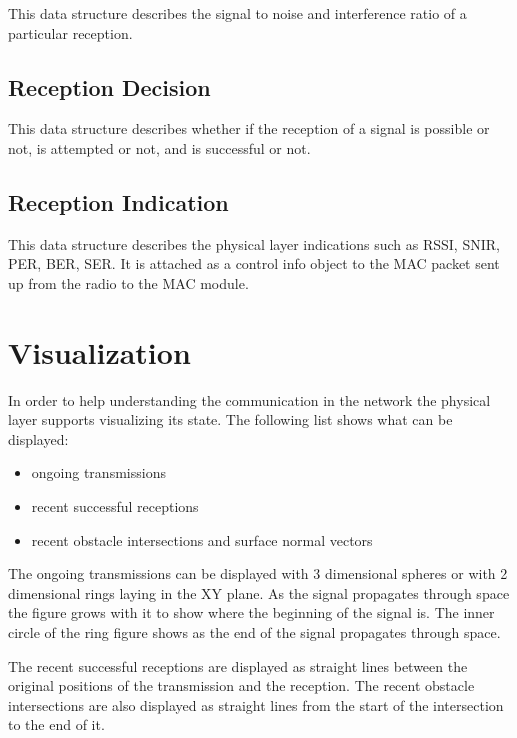 This data structure describes the signal to noise and interference ratio of a
particular reception.

\subsection{Reception Decision}

This data structure describes whether if the reception of a signal is possible
or not, is attempted or not, and is successful or not.

\subsection{Reception Indication}

This data structure describes the physical layer indications such as RSSI, SNIR,
PER, BER, SER. It is attached as a control info object to the MAC packet sent up
from the radio to the MAC module.

\section{Visualization}

In order to help understanding the communication in the network the physical
layer supports visualizing its state. The following list shows what can be
displayed:

\begin{itemize}
  \item ongoing transmissions
  \item recent successful receptions
  \item recent obstacle intersections and surface normal vectors
\end{itemize}

The ongoing transmissions can be displayed with 3 dimensional spheres or with 2
dimensional rings laying in the XY plane. As the signal propagates through space
the figure grows with it to show where the beginning of the signal is. The inner
circle of the ring figure shows as the end of the signal propagates through
space. 

The recent successful receptions are displayed as straight lines between the
original positions of the transmission and the reception. The recent obstacle
intersections are also displayed as straight lines from the start of the
intersection to the end of it.

